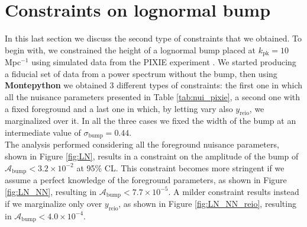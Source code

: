 \section{Constraints on lognormal bump}
In this last section we discuss the second type of constraints that we obtained. To begin with, we constrained the height of a lognormal bump placed at $k_\text{pk}=10$ Mpc$^{-1}$ using simulated data from the PIXIE experiment \cite{pixie}. We started producing a fiducial set of data from a power spectrum without the bump, then using \textbf{Montepython} we obtained 3 different types of constraints: the first one in which all the nuisance parameters presented in Table \ref{tab:nui_pixie}, a second one with a fixed foreground and a last one in which, by letting vary also $y_\text{reio}$, we marginalized over it.  In all the three cases we fixed the width of the bump at an intermediate value of $\sigma_\text{bump}=0.44$.\\
The analysis performed considering all the foreground nuisance parameters, shown in Figure \ref{fig:LN}, results in a constraint on the amplitude of the bump of $\mathcal{A}_\text{bump}<3.2\times10^{-2}$ at 95\% CL. This constraint becomes more stringent if we assume a perfect knowledge of the foreground parameters, as shown in Figure \ref{fig:LN_NN}, resulting in $\mathcal{A}_\text{bump}<7.7\times10^{-5}$. A milder constraint results instead if we marginalize only over $y_\text{reio}$, as shown in Figure \ref{fig:LN_NN_reio}, resulting in $\mathcal{A}_\text{bump}<4.0\times10^{-4}$.\\ 

